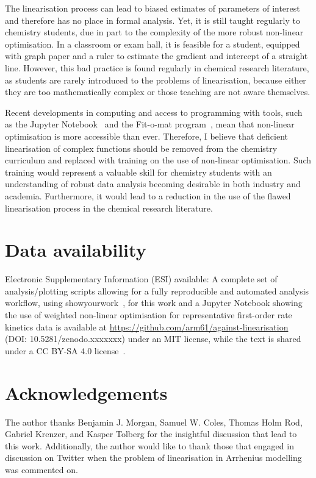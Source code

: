 \documentclass[reprint,superscriptaddress,nobibnotes,amsmath,amssymb]{revtex4-2}
\begin{document}
The linearisation process can lead to biased estimates of parameters of interest and therefore has no place in formal analysis. 
Yet, it is still taught regularly to chemistry students, due in part to the complexity of the more robust non-linear optimisation. 
In a classroom or exam hall, it is feasible for a student, equipped with graph paper and a ruler to estimate the gradient and intercept of a straight line. 
However, this bad practice is found regularly in chemical research literature, as students are rarely introduced to the problems of linearisation, because either they are too mathematically complex or those teaching are not aware themselves. 

Recent developments in computing and access to programming with tools, such as the Jupyter Notebook~\cite{kluyver_jupyter_2016} and the Fit-o-mat program~\cite{mglich_open_2018}, mean that non-linear optimisation is more accessible than ever. 
Therefore, I believe that deficient linearisation of complex functions should be removed from the chemistry curriculum and replaced with training on the use of non-linear optimisation. 
Such training would represent a valuable skill for chemistry students with an understanding of robust data analysis becoming desirable in both industry and academia. 
Furthermore, it would lead to a reduction in the use of the flawed linearisation process in the chemical research literature.

\section*{Data availability}

Electronic Supplementary Information (ESI) available: A complete set of analysis/plotting scripts allowing for a fully reproducible and automated analysis workflow, using showyourwork~\cite{luger_showyourwork_2021}, for this work and a Jupyter Notebook showing the use of weighted non-linear optimisation for representative first-order rate kinetics data is available at \url{https://github.com/arm61/against-linearisation} (DOI: 10.5281/zenodo.xxxxxxx) under an MIT license, while the text is shared under a CC BY-SA 4.0 license~\cite{mccluskey_github_2023}. \\

\section*{Acknowledgements}

The author thanks Benjamin J. Morgan, Samuel W. Coles, Thomas Holm Rod, Gabriel Krenzer, and Kasper Tolberg for the insightful discussion that lead to this work. 
Additionally, the author would like to thank those that engaged in discussion on Twitter when the problem of linearisation in Arrhenius modelling was commented on. 


\end{document}
